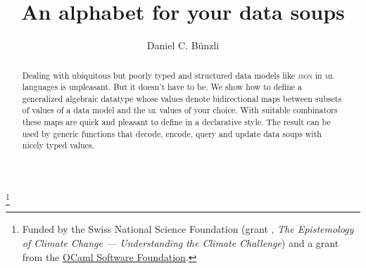 \documentclass[nolinenum]{jfp}
\begin{document}


\righttitle{}

\newcommand{\thetitle}{An alphabet for your data soups}

\title{\thetitle}
\lefttitle{\thetitle}

\totalpg{\pageref{lastpage01}}

\newcommand{\json}{\textsc{json}}
\newcommand{\ocaml}{\textsc{ocaml}}
\newcommand{\ml}{\textsc{ml}}
\newcommand{\code}[1]{{\lstinline[language=ocaml]{#1}}}

\begin{authgrp}
  \renewcommand*{\thefootnote}{\fnsymbol{footnote}}
  \author{Daniel C. Bünzli}%
  \footnote{Funded by the Swiss National Science
  Foundation (grant ,\emph{
  The Epistemology of Climate Change –– Understanding the Climate Challenge})
  and a grant from the
  \href{https://ocaml-sf.org/}{OCaml Software Foundation}.
  }%

\end{authgrp}

\begin{abstract}
  Dealing with ubiquitous but poorly typed and structured data models
  like \json{} in \ml{} languages is unpleasant. But it doesn't have
  to be. We show how to define a generalized algebraic datatype whose
  values denote bidirectional maps between subsets of values of a data
  model and the \ml{} values of your choice. With suitable combinators
  these maps are quick and pleasant to define in a declarative
  style. The result can be used by generic functions that decode,
  encode, query and update data soups with nicely typed values.
\end{abstract}
\end{document}
